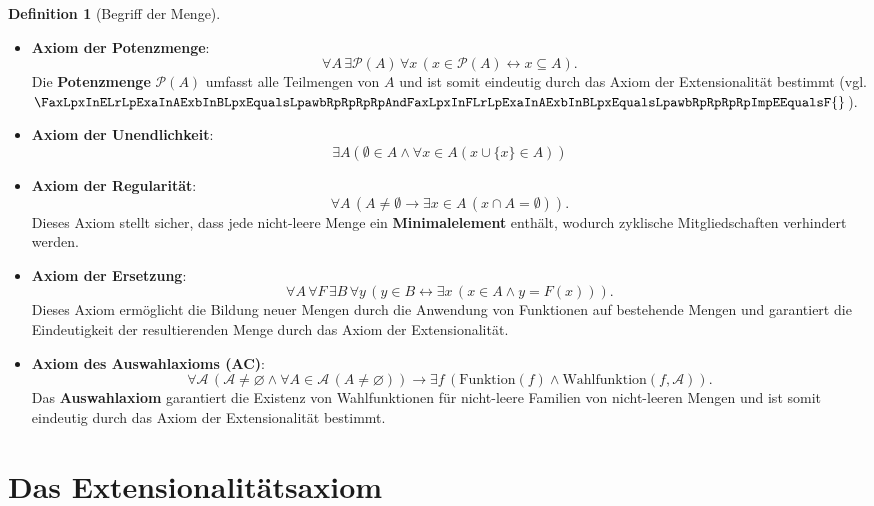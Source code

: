 \documentclass{book}
\theoremstyle{plain}
\theoremstyle{remark}
\theoremstyle{definition}
\newtheorem{definition}{Definition}[section]
\begin{document}
\begin{definition}[Begriff der Menge]
\begin{itemize}
        \item \textbf{Axiom der Potenzmenge}: 
        \[
        \forall A \, \exists \mathcal{P}(A) \, \forall x \, \left( x \in \mathcal{P}(A) \leftrightarrow x \subseteq A \right).
        \]
        Die \textbf{Potenzmenge} \(\mathcal{P}(A)\) umfasst alle Teilmengen von \(A\) und ist somit eindeutig durch das Axiom der Extensionalität bestimmt (vgl. \(\FaxLpxInELrLpExaInAExbInBLpxEqualsLpawbRpRpRpRpAndFaxLpxInFLrLpExaInAExbInBLpxEqualsLpawbRpRpRpRpImpEEqualsF{}\)).
        
        \item \textbf{Axiom der Unendlichkeit}:
        \[
        \exists A (\emptyset \in A \land \forall x\in A (x \cup \{x\} \in A))
        \]
        
        \item \textbf{Axiom der Regularität}:
        \[
        \forall A \, \left( A \neq \emptyset \rightarrow \exists x \in A \, (x \cap A = \emptyset) \right).
        \]
        Dieses Axiom stellt sicher, dass jede nicht-leere Menge ein \textbf{Minimalelement} enthält, wodurch zyklische Mitgliedschaften verhindert werden.
        
        \item \textbf{Axiom der Ersetzung}:
        \[
        \forall A \, \forall F \, \exists B \, \forall y \, \left( y \in B \leftrightarrow \exists x \, (x \in A \land y = F(x)) \right).
        \]
        Dieses Axiom ermöglicht die Bildung neuer Mengen durch die Anwendung von Funktionen auf bestehende Mengen und garantiert die Eindeutigkeit der resultierenden Menge durch das Axiom der Extensionalität.
        
        \item \textbf{Axiom des Auswahlaxioms (AC)}:
        \[
        \forall \mathcal{A} \, \left( \mathcal{A} \neq \varnothing \land \forall A \in \mathcal{A} \, (A \neq \varnothing) \right) \rightarrow \exists f \, \left( \text{Funktion}(f) \land \text{Wahlfunktion}(f, \mathcal{A}) \right).
        \]
        Das \textbf{Auswahlaxiom} garantiert die Existenz von Wahlfunktionen für nicht-leere Familien von nicht-leeren Mengen und ist somit eindeutig durch das Axiom der Extensionalität bestimmt.
    \end{itemize}
\end{definition}






\section{Das Extensionalitätsaxiom}
\end{document}
